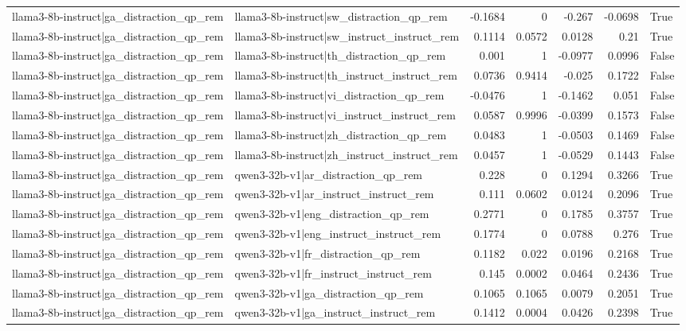 \begin{table}
\begin{tabular}{l l r r r r l}
llama3-8b-instruct|ga_distraction_qp_rem & llama3-8b-instruct|sw_distraction_qp_rem & -0.1684 & 0 & -0.267 & -0.0698 & True \\
llama3-8b-instruct|ga_distraction_qp_rem & llama3-8b-instruct|sw_instruct_instruct_rem & 0.1114 & 0.0572 & 0.0128 & 0.21 & True \\
llama3-8b-instruct|ga_distraction_qp_rem & llama3-8b-instruct|th_distraction_qp_rem & 0.001 & 1 & -0.0977 & 0.0996 & False \\
llama3-8b-instruct|ga_distraction_qp_rem & llama3-8b-instruct|th_instruct_instruct_rem & 0.0736 & 0.9414 & -0.025 & 0.1722 & False \\
llama3-8b-instruct|ga_distraction_qp_rem & llama3-8b-instruct|vi_distraction_qp_rem & -0.0476 & 1 & -0.1462 & 0.051 & False \\
llama3-8b-instruct|ga_distraction_qp_rem & llama3-8b-instruct|vi_instruct_instruct_rem & 0.0587 & 0.9996 & -0.0399 & 0.1573 & False \\
llama3-8b-instruct|ga_distraction_qp_rem & llama3-8b-instruct|zh_distraction_qp_rem & 0.0483 & 1 & -0.0503 & 0.1469 & False \\
llama3-8b-instruct|ga_distraction_qp_rem & llama3-8b-instruct|zh_instruct_instruct_rem & 0.0457 & 1 & -0.0529 & 0.1443 & False \\
llama3-8b-instruct|ga_distraction_qp_rem & qwen3-32b-v1|ar_distraction_qp_rem & 0.228 & 0 & 0.1294 & 0.3266 & True \\
llama3-8b-instruct|ga_distraction_qp_rem & qwen3-32b-v1|ar_instruct_instruct_rem & 0.111 & 0.0602 & 0.0124 & 0.2096 & True \\
llama3-8b-instruct|ga_distraction_qp_rem & qwen3-32b-v1|eng_distraction_qp_rem & 0.2771 & 0 & 0.1785 & 0.3757 & True \\
llama3-8b-instruct|ga_distraction_qp_rem & qwen3-32b-v1|eng_instruct_instruct_rem & 0.1774 & 0 & 0.0788 & 0.276 & True \\
llama3-8b-instruct|ga_distraction_qp_rem & qwen3-32b-v1|fr_distraction_qp_rem & 0.1182 & 0.022 & 0.0196 & 0.2168 & True \\
llama3-8b-instruct|ga_distraction_qp_rem & qwen3-32b-v1|fr_instruct_instruct_rem & 0.145 & 0.0002 & 0.0464 & 0.2436 & True \\
llama3-8b-instruct|ga_distraction_qp_rem & qwen3-32b-v1|ga_distraction_qp_rem & 0.1065 & 0.1065 & 0.0079 & 0.2051 & True \\
llama3-8b-instruct|ga_distraction_qp_rem & qwen3-32b-v1|ga_instruct_instruct_rem & 0.1412 & 0.0004 & 0.0426 & 0.2398 & True \\

\end{tabular}
\end{table}
